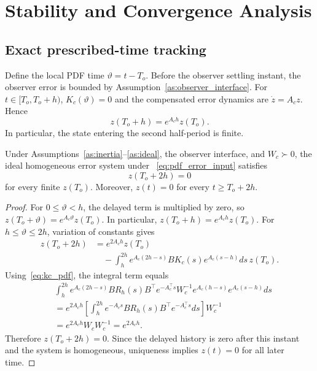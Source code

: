 \section{Stability and Convergence Analysis}\label{sec:stability}

\subsection{Exact prescribed-time tracking}
Define the local PDF time $\vartheta=t-T_o$. Before the observer settling
instant, the observer error is bounded by Assumption~\ref{as:observer_interface}.
For $t\in[T_o,T_o+h)$, $K_c(\vartheta)=0$ and the compensated error dynamics
are $\dot z=A_cz$. Hence
\begin{equation}
 z(T_o+h)=e^{A_ch}z(T_o).
 \label{eq:phaseI_bound}
\end{equation}
In particular, the state entering the second half-period is finite.

\begin{theorem}\label{thm:pdf_nullification}
Under Assumptions~\ref{as:inertia}--\ref{as:ideal}, the observer interface,
and $W_c\succ0$, the ideal homogeneous error system under
~\eqref{eq:pdf_error_input} satisfies
\begin{equation}
 z(T_o+2h)=0
\end{equation}
for every finite $z(T_o)$. Moreover, $z(t)=0$ for every $t\geq T_o+2h$.
\end{theorem}
\begin{proof}
For $0\leq\vartheta<h$, the delayed term is multiplied by zero, so
$z(T_o+\vartheta)=e^{A_c\vartheta}z(T_o)$. In particular,
$z(T_o+h)=e^{A_ch}z(T_o)$. For $h\leq\vartheta\leq2h$, variation of
constants gives
\begin{align}
 z(T_o+2h)
 &=e^{2A_ch}z(T_o)\\
 &\quad-\int_h^{2h}e^{A_c(2h-s)}B K_c(s)e^{A_c(s-h)}ds\,z(T_o).
 \label{eq:pdf_variation_constants}
\end{align}
Using~\eqref{eq:kc_pdf}, the integral term equals
\begin{align*}
 &\int_h^{2h}e^{A_c(2h-s)}BR_h(s)B^\top e^{-A_c^\top s}
 W_c^{-1}e^{A_c(h-s)}e^{A_c(s-h)}ds\\
 &=e^{2A_ch}\left[\int_h^{2h}e^{-A_cs}BR_h(s)B^\top
 e^{-A_c^\top s}ds\right]W_c^{-1}\\
 &=e^{2A_ch}W_cW_c^{-1}=e^{2A_ch}.
\end{align*}
Therefore $z(T_o+2h)=0$. Since the delayed history is zero after this
instant and the system is homogeneous, uniqueness implies $z(t)=0$ for all
later time.\end{proof}

